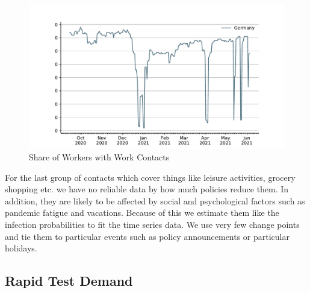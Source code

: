 \begin{figure}[ht]
    \centering
    \includegraphics[width=\textwidth]{../figures/results/figures/data/work_multiplier_since_sep}
    \caption{Share of Workers with Work Contacts}
    \label{fig:work_multiplier}
\end{figure}


For the last group of contacts which cover things like leisure activities, grocery
shopping etc. we have no reliable data by how much policies reduce them. In addition,
they are likely to be affected by social and psychological factors such as pandemic
fatigue and vacations. Because of this we estimate them like the infection probabilities
to fit the time series data. We use very few change points and tie them to particular
events such as policy announcements or particular holidays.

\FloatBarrier

\subsection{Rapid Test Demand}


